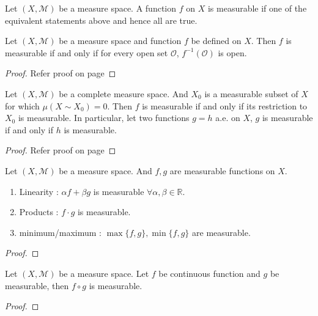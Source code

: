 \begin{definition} 
	Let $(X,\mathcal{M})$ be a measure space.
	A function $f$ on $X$ is measurable if one of the equivalent statements above and  hence all are true.
\end{definition}

\begin{theorem}
	Let $(X,\mathcal{M})$ be a measure space and function $f$ be defined on $X$.
	Then $f$ is measurable if and only if for every open set $\mathcal{O}$, $f^{-1}(\mathcal{O})$ is open.
\end{theorem}
\begin{proof}
	Refer proof on page \pageref{thm:measurabilityopen}
\end{proof}

\begin{theorem}
	Let $(X,\mathcal{M})$ be a complete measure space.
	And $X_0$ is a measurable subset of $X$ for which $\mu(X \sim X_0) = 0$.
	Then $f$ is measurable if and only if its restriction to $X_0$ is measurable.
	In particular, let two functions $g = h$ a.e. on $X$, $g$ is measurable if and only if $h$ is measurable.
\end{theorem}
\begin{proof}
	Refer proof on page \pageref{thm:measurabilityae}
\end{proof}

\begin{theorem}
	Let $(X,\mathcal{M})$ be a measure space. And $f,g$ are measurable functions on $X$.
	\begin{enumerate}
		\item Linearity : $\alpha f + \beta g$ is measurable $\forall \alpha,\beta \in \mathbb{R}$.
		\item Products : $f \cdot g$ is measurable.
		\item minimum/maximum : $\max\{f,g\}, \min\{f,g\}$ are measurable.
	\end{enumerate}
\end{theorem}
\begin{proof}
\end{proof}

\begin{theorem}
	Let $(X,\mathcal{M})$ be a measure space.
	Let $f$ be continuous function and $g$ be measurable, then $f \circ g$ is measurable.
\end{theorem}
\begin{proof}
\end{proof}

